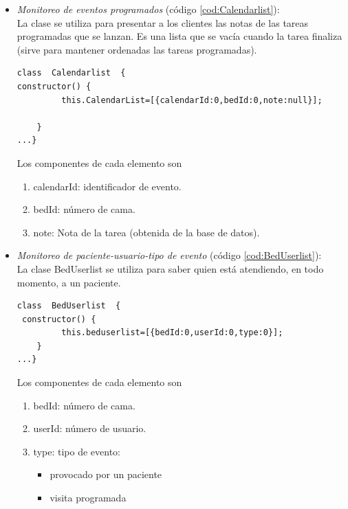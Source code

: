 \begin{itemize}
\item \textit{ Monitoreo de eventos programados} (código \ref{cod:Calendarlist}):\\
La clase se utiliza para presentar a los clientes las notas de las tareas programadas que se lanzan. Es una lista que se vacía cuando la tarea finaliza (sirve para mantener ordenadas las tareas programadas).

\begin{lstlisting}[label=cod:Calendarlist,caption=  Clase CalendarList.]
class  Calendarlist  {   
constructor() {
         this.CalendarList=[{calendarId:0,bedId:0,note:null}];                
        
    }
...}
\end{lstlisting}

Los componentes de cada elemento son 
	\begin{enumerate}
		\item calendarId: identificador de evento.
		\item bedId: número de cama.
		\item note: Nota de la tarea (obtenida de la base de datos).		

	\end{enumerate}



\pagebreak
\item \textit{ Monitoreo de paciente-usuario-tipo de evento} (código \ref{cod:BedUserlist}):\\
La clase BedUserlist se utiliza para saber quien está atendiendo, en todo momento, a un paciente.

\begin{lstlisting}[label=cod:BedUserlist,caption=  Clase BedsUserList.]
class  BedUserlist  { 
 constructor() {
         this.beduserlist=[{bedId:0,userId:0,type:0}];                        
    }
...}
\end{lstlisting}

Los componentes de cada elemento son 
	\begin{enumerate}
		\item bedId: número de cama.
		\item userId: número de usuario.
		\item type: tipo de evento: 
		\begin{itemize}
			\item provocado por un paciente
			\item visita programada		
		\end{itemize}		 	

	\end{enumerate}


\end{itemize}
